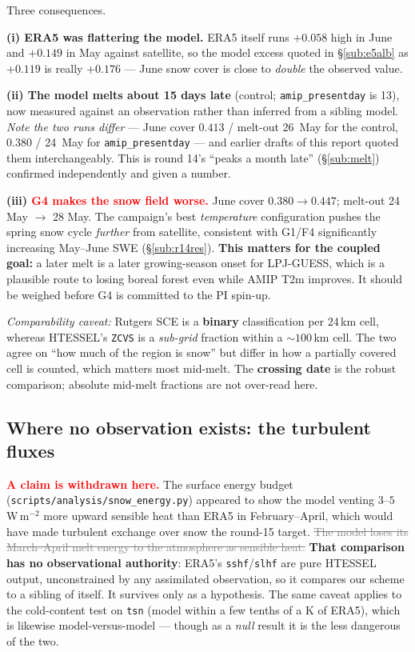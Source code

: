 \documentclass[10pt]{article}
\newcommand{\dead}[1]{\textcolor{gray}{\sout{#1}}}
\begin{document}
\noindent Three consequences.

\textbf{(i) ERA5 was flattering the model.} ERA5 itself runs $+0.058$ high in June and
$+0.149$ in May against satellite, so the model excess quoted in \S\ref{sub:e5alb} as
$+0.119$ is really $\mathbf{+0.176}$ --- June snow cover is close to \emph{double} the
observed value.

\textbf{(ii) The model melts about 15 days late} (control; \texttt{amip\_presentday} is 13),
now measured against an observation rather than inferred from a sibling model.
\emph{Note the two runs differ} --- June cover $0.413$ / melt-out 26~May for the control,
$0.380$ / 24~May for \texttt{amip\_presentday} --- and earlier drafts of this report quoted
them interchangeably. This is round 14's ``peaks a month late''
(\S\ref{sub:melt}) confirmed independently and given a number.

\textbf{(iii) \textcolor{red}{G4 makes the snow field worse.}} June cover
$0.380 \to 0.447$; melt-out 24 May $\to$ 28 May. The campaign's best \emph{temperature}
configuration pushes the spring snow cycle \emph{further} from satellite, consistent
with G1/F4 significantly increasing May--June SWE (\S\ref{sub:r14res}). \textbf{This
matters for the coupled goal:} a later melt is a later growing-season onset for
LPJ-GUESS, which is a plausible route to losing boreal forest even while AMIP T2m
improves. It should be weighed before G4 is committed to the PI spin-up.

\emph{Comparability caveat:} Rutgers SCE is a \textbf{binary} classification per 24\,km
cell, whereas HTESSEL's \texttt{ZCVS} is a \emph{sub-grid} fraction within a ${\sim}100$\,km
cell. The two agree on ``how much of the region is snow'' but differ in how a partially
covered cell is counted, which matters most mid-melt. The \textbf{crossing date} is the
robust comparison; absolute mid-melt fractions are not over-read here.

\subsection{Where no observation exists: the turbulent fluxes}\label{sub:noobs}
\textcolor{red}{\textbf{A claim is withdrawn here.}} The surface energy budget
(\texttt{scripts/analysis/snow\_energy.py}) appeared to show the model venting
$3$--$5$\,W\,m$^{-2}$ more upward sensible heat than ERA5 in February--April, which would
have made turbulent exchange over snow the round-15 target. \dead{The model loses its
March--April melt energy to the atmosphere as sensible heat.} \textbf{That comparison has
no observational authority}: ERA5's \texttt{sshf}/\texttt{slhf} are pure HTESSEL output,
unconstrained by any assimilated observation, so it compares our scheme to a sibling of
itself. It survives only as a hypothesis. The same caveat applies to the cold-content
test on \texttt{tsn} (model within a few tenths of a K of ERA5), which is likewise
model-versus-model --- though as a \emph{null} result it is the less dangerous of the two.
\end{document}
